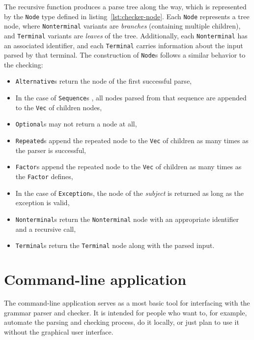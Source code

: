 \documentclass[english,engineering]{wizthesis}
\begin{document}
The recursive function produces a parse tree along the way, which is represented
by the \texttt{Node} type defined in listing~\ref{lst:checker-node}. Each
\texttt{Node} represents a tree node, where \texttt{Nonterminal} variants are
\emph{branches} (containing multiple children), and \texttt{Terminal} variants
are \emph{leaves} of the tree. Additionally, each \texttt{Nonterminal} has an
associated identifier, and each \texttt{Terminal} carries information about the
input parsed by that terminal. The construction of \texttt{Node}s follows a
similar behavior to the checking:
\begin{itemize}
  \item \texttt{Alternative}s return the node of the first successful parse,
  \item In the case of \texttt{Sequence}s , all nodes parsed from that sequence
  are appended to the \texttt{Vec} of children nodes,
  \item \texttt{Optional}s may not return a node at all,
  \item \texttt{Repeated}s append the repeated node to the \texttt{Vec} of
  children as many times as the parser is successful,
  \item \texttt{Factor}s append the repeated node to the \texttt{Vec} of
  children as many times as the \texttt{Factor} defines,
  \item In the case of \texttt{Exception}s, the node of the \emph{subject} is
  returned as long as the exception is valid,
  \item \texttt{Nonterminal}s return the \texttt{Nonterminal} node with an
  appropriate identifier and a recursive call,
  \item \texttt{Terminal}s return the \texttt{Terminal} node along with the
  parsed input.
\end{itemize}

\newpage

\section{Command-line application} \label{sec:command-line-application}

The command-line application serves as a most basic tool for interfacing with
the grammar parser and checker. It is intended for people who want to, for
example, automate the parsing and checking process, do it locally, or just plan
to use it without the graphical user interface.
\end{document}

